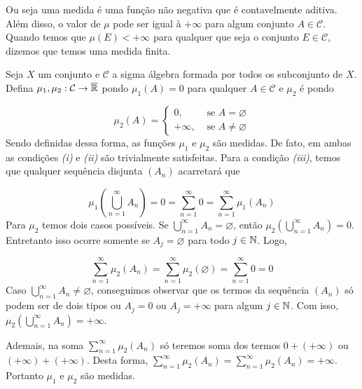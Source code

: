 Ou seja uma medida é uma função não negativa que é contavelmente aditiva.
Além disso, o valor de $\mu$ pode ser igual à $+\infty$ para algum conjunto $A \in \mathcal{C}$.
Quando temos que $\mu(E) < +\infty$ para qualquer que seja o conjunto $E \in \mathcal{C}$, dizemos que temos uma medida finita.


\begin{example}
    Seja $X$ um conjunto e $\mathcal{C}$ a sigma álgebra formada por todos os subconjunto de $X$.    
    Defina $\mu_1, \mu_2:\mathcal{C} \to \operatorname{\overline{\mathbb{R}}}$ pondo $\mu_1(A) = 0$ para qualquer  $A \in \mathcal{C}$ e 
    $\mu_2$ é  pondo 

$$\mu_2(A) = \left\{\begin{array}{cc}
0, & \textrm{\ se \ } A = \varnothing \\
+\infty,& \textrm{\ se \ } A \neq \varnothing
\end{array}\right.$$
Sendo definidas dessa forma, as funções $\mu_1$ e $\mu_2$ são medidas.
De fato, em ambas as condições \textit{(i)} e \textit{(ii)} são trivialmente satisfeitas.
Para a condição \textit{(iii)}, temos que qualquer sequência disjunta $(A_n)$ acarretará que

$$\mu_1\left(\bigcup_{n = 1}^\infty A_n\right) = 0 = \sum_{n = 1}^\infty 0 = \sum_{n = 1}^\infty \mu_1(A_n) $$
Para $\mu_2$ temos dois casos possíveis.
Se  $\displaystyle \bigcup_{n = 1}^\infty A_n  = \varnothing$, então $\mu_2\left(\displaystyle \bigcup_{n = 1}^\infty A_n\right) = 0$. Entretanto isso ocorre somente se $A_j = \varnothing$ para todo $j \in \operatorname{\mathbb{N}}$.
Logo, 

$$\sum_{n = 1}^\infty \mu_2(A_n) = \sum_{n = 1}^\infty \mu_2(\varnothing) = \sum_{n = 1}^\infty 0 = 0$$
Caso $\displaystyle \bigcup_{n = 1}^\infty A_n  \neq  \varnothing$, conseguimos observar que os termos da sequência $(A_n)$ só podem ser de dois tipos ou $A_j = 0$ ou $A_j = +\infty$ para algum $j \in \operatorname{\mathbb{N}}$. Com isso,  $\mu_2\left(\displaystyle \bigcup_{n = 1}^\infty A_n\right) = +\infty$.

Ademais, na soma $\displaystyle \sum_{n = 1}^\infty \mu_2(A_n)$ só teremos soma dos termos $0 + (+ \infty)$ ou $(+\infty) + (+\infty)$.
Desta forma, $\displaystyle \sum_{n = 1}^\infty \mu_2(A_n) = \sum_{n = 1}^\infty \mu_2(A_n) = +\infty$.
Portanto $\mu_1$ e $\mu_2$ são medidas.
\end{example}



